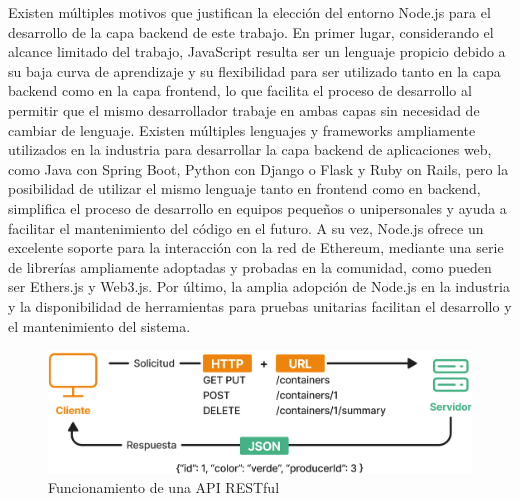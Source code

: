 Existen múltiples motivos que justifican la elección del entorno Node.js para el desarrollo de la capa backend de este trabajo. En primer lugar, considerando el alcance limitado del trabajo, JavaScript resulta ser un lenguaje propicio debido a su baja curva de aprendizaje y su flexibilidad para ser utilizado tanto en la capa backend como en la capa frontend, lo que facilita el proceso de desarrollo al permitir que el mismo desarrollador trabaje en ambas capas sin necesidad de cambiar de lenguaje. Existen múltiples lenguajes y frameworks ampliamente utilizados en la industria para desarrollar la capa backend de aplicaciones web, como Java con Spring Boot, Python con Django o Flask y Ruby on Rails, pero la posibilidad de utilizar el mismo lenguaje tanto en frontend como en backend, simplifica el proceso de desarrollo en equipos pequeños o unipersonales y ayuda a facilitar el mantenimiento del código en el futuro. A su vez, Node.js ofrece un excelente soporte para la interacción con la red de Ethereum, mediante una serie de librerías ampliamente adoptadas y probadas en la comunidad, como pueden ser Ethers.js y Web3.js. Por último, la amplia adopción de Node.js en la industria y la disponibilidad de herramientas para pruebas unitarias facilitan el desarrollo y el mantenimiento del sistema. 

\begin{figure}[!tb]
    \centering
    \includegraphics[width=\linewidth]{Figures/backend-api-rest.png}
    \caption{Funcionamiento de una API RESTful}
    \label{fig:api-rest}
\end{figure}

